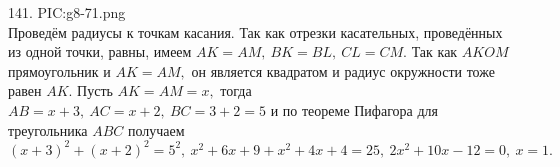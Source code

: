 141. {{PIC:g8-71.png}}\\
Проведём радиусы к точкам касания. Так как отрезки касательных, проведённых из одной точки, равны, имеем $AK=AM,\ BK=BL,\ CL=CM.$ Так как $AKOM$ прямоугольник и $AK=AM,$ он является квадратом и радиус окружности тоже равен $AK.$ Пусть $AK=AM=x,$ тогда $AB=x+3,\ AC=x+2,\ BC=3+2=5$ и по теореме Пифагора для треугольника $ABC$ получаем $(x+3)^2+(x+2)^2=5^2,\ x^2+6x+9+x^2+4x+4=25,\ 2x^2+10x-12=0,\ x=1.$\\

